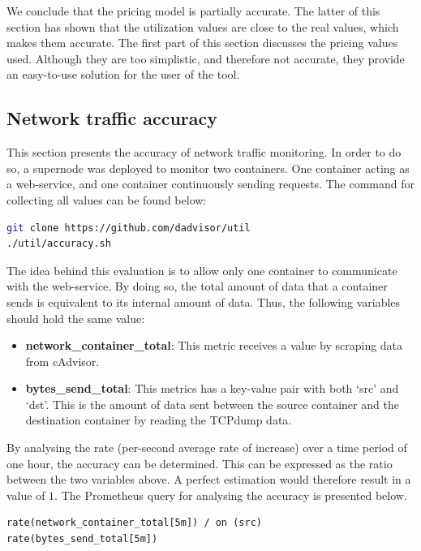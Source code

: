 \noindent 
We conclude that the pricing model is partially accurate. The latter of this section has shown that the utilization values are close to the real values, which makes them accurate. The first part of this section discusses the pricing values used. Although they are too simplistic, and therefore not accurate, they provide an easy-to-use solution for the user of the tool.

\subsection{Network traffic accuracy} \label{sec:eval_k}
This section presents the accuracy of network traffic monitoring. In order to do so, a supernode was deployed to monitor two containers. One container acting as a web-service, and one container continuously sending requests. The command for collecting all values can be found below:

\begin{lstlisting}[language=bash, caption=Docker-compose]
git clone https://github.com/dadvisor/util
./util/accuracy.sh
\end{lstlisting}

\noindent
The idea behind this evaluation is to allow only one container to communicate with the web-service. By doing so, the total amount of data that a container sends is equivalent to its internal amount of data. Thus, the following variables should hold the same value:
\begin{itemize}
    \item \textbf{network\_container\_total}: This metric receives a value by scraping data from cAdvisor.
    \item \textbf{bytes\_send\_total}: This metrics has a key-value pair with both `src' and `dst'. This is the amount of data sent between the source container and the destination container by reading the TCPdump data.
\end{itemize}

\noindent
By analysing the rate (per-second average rate of increase) over a time period of one hour, the accuracy can be determined. This can be expressed as the ratio between the two variables above. A perfect estimation would therefore result in a value of $1$. The Prometheus query for analysing the accuracy is presented below.

\begin{verbatim}
rate(network_container_total[5m]) / on (src) 
rate(bytes_send_total[5m])
\end{verbatim}

